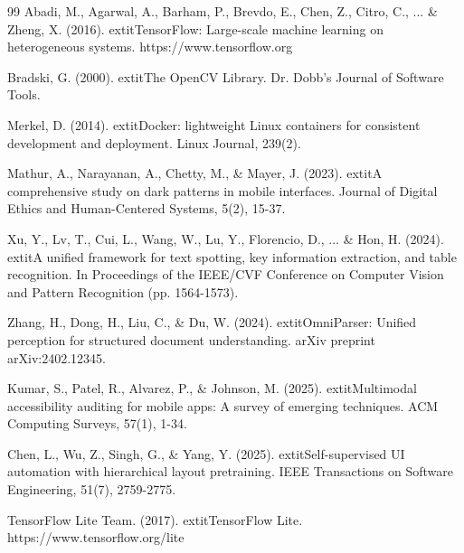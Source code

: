 \documentclass[11pt,a4paper]{report}
\begin{document}
\begin{thebibliography}{99}
Abadi, M., Agarwal, A., Barham, P., Brevdo, E., Chen, Z., Citro, C., ... \& Zheng, X. (2016).
	extit{TensorFlow: Large-scale machine learning on heterogeneous systems}.
https://www.tensorflow.org

Bradski, G. (2000).
	extit{The OpenCV Library}.
Dr. Dobb's Journal of Software Tools.

Merkel, D. (2014).
	extit{Docker: lightweight Linux containers for consistent development and deployment}.
Linux Journal, 239(2).

Mathur, A., Narayanan, A., Chetty, M., \& Mayer, J. (2023).
	extit{A comprehensive study on dark patterns in mobile interfaces}.
Journal of Digital Ethics and Human-Centered Systems, 5(2), 15-37.

Xu, Y., Lv, T., Cui, L., Wang, W., Lu, Y., Florencio, D., ... \& Hon, H. (2024).
	extit{A unified framework for text spotting, key information extraction, and table recognition}.
In Proceedings of the IEEE/CVF Conference on Computer Vision and Pattern Recognition (pp. 1564-1573).

Zhang, H., Dong, H., Liu, C., \& Du, W. (2024).
	extit{OmniParser: Unified perception for structured document understanding}.
arXiv preprint arXiv:2402.12345.

Kumar, S., Patel, R., Alvarez, P., \& Johnson, M. (2025).
	extit{Multimodal accessibility auditing for mobile apps: A survey of emerging techniques}.
ACM Computing Surveys, 57(1), 1-34.

Chen, L., Wu, Z., Singh, G., \& Yang, Y. (2025).
	extit{Self-supervised UI automation with hierarchical layout pretraining}.
IEEE Transactions on Software Engineering, 51(7), 2759-2775.

TensorFlow Lite Team. (2017).
	extit{TensorFlow Lite}.
https://www.tensorflow.org/lite

\end{thebibliography}
\end{document}
